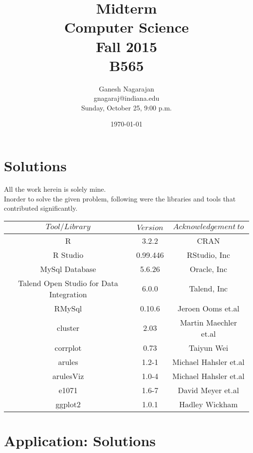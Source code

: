 \documentclass{article}
\begin{document}
\title{Midterm\\ Computer Science \\ Fall 2015\\ B565}         %
\author{Ganesh Nagarajan\\gnagaraj@indiana.edu\\ Sunday, October 25, 9:00 p.m.}        %
\date{\today}          %
\maketitle


\makeatother     %



\pagestyle{plain}
\section*{Solutions}
All the work herein is solely mine.\\
Inorder to solve the given problem, following were the libraries and tools that contributed significantly.\\

\begin{tabular}{|c|c|c|} \hline
$Tool/Library$ & $Version$ & $Acknowledgement \: to$ \\ \hline 
R & 3.2.2 & CRAN \\
R Studio & 0.99.446 & RStudio, Inc\\
MySql Database & 5.6.26 & Oracle, Inc\\
Talend Open Studio for Data Integration & 6.0.0 & Talend, Inc\\
RMySql & 0.10.6 & Jeroen Ooms et.al\\
cluster & 2.03 & Martin Maechler et.al\\
corrplot & 0.73 & Taiyun Wei\\
arules & 1.2-1 & Michael Hahsler et.al\\
arulesViz & 1.0-4 & Michael Hahsler et.al \\
e1071 & 1.6-7 & David Meyer et.al \\
ggplot2 & 1.0.1 & Hadley Wickham \\
\hline
\end{tabular}
\section*{Application: Solutions}
\end{document}
